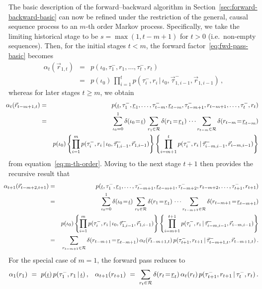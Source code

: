\documentclass[a4paper]{article}
\newcommand{\ui}{\underline{\iota}}
\newcommand{\ur}{\underline{r}}
\newcommand{\vr}{\vec{r}}
\newcommand{\tm}{\tau^{-}}
\begin{document}
The basic description of the forward--backward algorithm in Section~\ref{sec:forward-backward-basic}
can now be refined under the restriction of the general, causal sequence process to an $m$-th order Markov process.
Specifically, we take the limiting historical stage to be $s=\max(1, t-m+1)$ for $t>0$ (i.e.\ non-empty sequences).
Then, for the initial stages $t<m$, the forward factor~\eqref{eq:fwd-pass-basic} becomes
\begin{eqnarray}
\alpha_t(\vr_{1,t}) & = & p(\iota_0,\tm_1,r_1,\ldots,\tm_t,r_t)
\nonumber\\& = &
p(\iota_0)\,\prod_{i=1}^{t}p(\tm_i,r_i\,|\,\iota_0,\vec{\tau}^-_{1,i-1},\vr_{1,i-1})\,,
\label{eq:fwd-pass-m-init}
\end{eqnarray}
whereas for later stages $t\ge m$, we obtain
\begin{eqnarray}
\!\!\!
\alpha_t(\vr_{t-m+1,t}) & = & p(\ui,\tm_1,\ur_1,\ldots,\tm_{t-m},\ur_{t-m},\tm_{t-m+1},r_{t-m+1},\ldots,\tm_t,r_t)
\nonumber\\& = &
\sum_{\iota_0=0}^{1}\delta(\iota_0\!=\!\ui)\,
\sum_{r_1\in{\cal R}} \delta(r_1\!=\!\ur_1)\,
\cdots
\sum_{r_{t-m}\in{\cal R}} \delta(r_{t-m}\!=\!\ur_{t-m})
\nonumber\\&&
p(\iota_0)\left\{\prod_{i=1}^{m}p(\tm_i,r_i\,|\,\iota_0,\vec{\tau}^-_{1,i-1},\vr_{1,i-1})\right\}
\left\{\prod_{i=m+1}^{t}p(\tm_i,r_i\,|\,\vec{\tau}^-_{i-m,i-1},\vr_{i-m,i-1})\right\}
\label{eq:fwd-pass-m}
\end{eqnarray}
from equation~\eqref{eq:m-th-order}. Moving to the next stage $t+1$ then provides the recursive result that
\begin{eqnarray}
\!\!\!\!\!
\alpha_{t+1}(\vr_{t-m+2,t+1}) & = & 
p(\ui,\tm_1,\ur_1,\ldots,\tm_{t-m+1},\ur_{t-m+1},\tm_{t-m+2},r_{t-m+2},\ldots,\tm_{t+1},r_{t+1})
\nonumber\\& = &
\sum_{\iota_0=0}^{1}\delta(\iota_0\!=\!\ui)\,
\sum_{r_1\in{\cal R}} \delta(r_1\!=\!\ur_1)\,
\cdots
\sum_{r_{t-m+1}\in{\cal R}} \delta(r_{t-m+1}\!=\!\ur_{t-m+1})
\nonumber\\&&
p(\iota_0)\left\{\prod_{i=1}^{m}p(\tm_i,r_i\,|\,\iota_0,\vec{\tau}^-_{1,i-1},\vr_{1,i-1})\right\}
\left\{\prod_{i=m+1}^{t+1}p(\tm_i,r_i\,|\,\vec{\tau}^-_{i-m,i-1},\vr_{i-m,i-1})\right\}
\nonumber\\& = &\!\!\!
\sum_{r_{t-m+1}\in{\cal R}} \delta(r_{t-m+1}\!=\!\ur_{t-m+1})\,\alpha_t(\vr_{t-m+1,t})
\,p(\tm_{t+1},r_{t+1}\,|\,\vec{\tau}^-_{t-m+1,t},\vr_{t-m+1,t})\,.
\label{eq:fwd-pass-m-recursive}
\end{eqnarray}
For the special case of $m=1$, the forward pass reduces to
\begin{eqnarray}
\alpha_1(r_1)~=~ p(\ui)\,p(\tm_1,r_1\,|\,\ui)\,, &&
\alpha_{t+1}(r_{t+1})~=~
\sum_{r_{t}\in{\cal R}} \delta(r_{t}\!=\!\ur_{t})\,\alpha_t(r_{t})
\,p(\tm_{t+1},r_{t+1}\,|\,\tm_{t},r_{t})\,.
\end{eqnarray}
\end{document}
